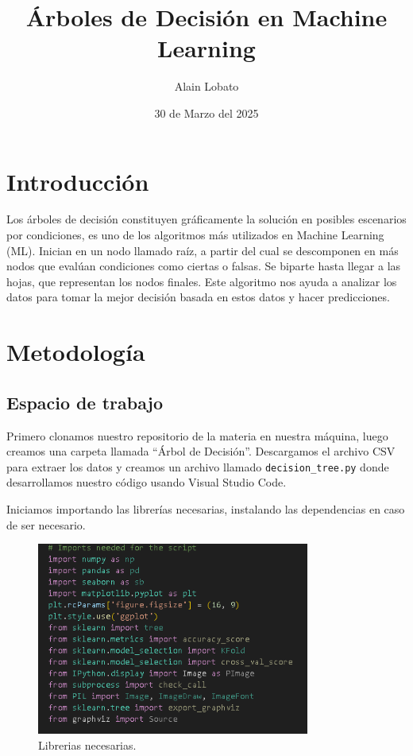\documentclass[a4paper,12pt]{article}
\title{\textbf{Árboles de Decisión en Machine Learning}}
\author{Alain Lobato}
\date{30 de Marzo del 2025}
\begin{document}
\maketitle

\section{Introducción}
Los árboles de decisión constituyen gráficamente la solución en posibles escenarios por condiciones, es uno de los algoritmos más utilizados en Machine Learning (ML). Inician en un nodo llamado raíz, a partir del cual se descomponen en más nodos que evalúan condiciones como ciertas o falsas. Se biparte hasta llegar a las hojas, que representan los nodos finales. Este algoritmo nos ayuda a analizar los datos para tomar la mejor decisión basada en estos datos y hacer predicciones.

\section{Metodología}
\subsection{Espacio de trabajo}
Primero clonamos nuestro repositorio de la materia en nuestra máquina, luego creamos una carpeta llamada ``Árbol de Decisión''. Descargamos el archivo CSV para extraer los datos y creamos un archivo llamado \texttt{decision\_tree.py} donde desarrollamos nuestro código usando Visual Studio Code.

Iniciamos importando las librerías necesarias, instalando las dependencias en caso de ser necesario.

\begin{figure}[H]
    \centering
    \includegraphics[width=0.8\textwidth]{1.png}
    \caption{Librerias necesarias.}
    \label{fig:libraries}
\end{figure}
\end{document}

